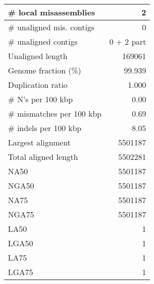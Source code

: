 \documentclass[12pt,a4paper]{article}
\begin{document}
\begin{table}[ht]
\begin{center}
\begin{tabular}{|l*{1}{|r}|}
\# local misassemblies & 2 \\ \hline
\# unaligned mis. contigs & 0 \\ \hline
\# unaligned contigs & 0 + 2 part \\ \hline
Unaligned length & 169061 \\ \hline
Genome fraction (\%) & 99.939 \\ \hline
Duplication ratio & 1.000 \\ \hline
\# N's per 100 kbp & 0.00 \\ \hline
\# mismatches per 100 kbp & 0.69 \\ \hline
\# indels per 100 kbp & 8.05 \\ \hline
Largest alignment & 5501187 \\ \hline
Total aligned length & 5502281 \\ \hline
NA50 & 5501187 \\ \hline
NGA50 & 5501187 \\ \hline
NA75 & 5501187 \\ \hline
NGA75 & 5501187 \\ \hline
LA50 & 1 \\ \hline
LGA50 & 1 \\ \hline
LA75 & 1 \\ \hline
LGA75 & 1 \\ \hline
\end{tabular}
\end{center}
\end{table}
\end{document}
